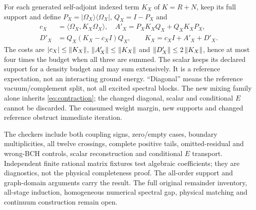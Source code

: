 For each generated self-adjoint indexed term $K_X$ of $K=R+N$, keep its full support and define $P_X=|\Omega_X\rangle\langle\Omega_X|$, $Q_X=I-P_X$ and
\begin{align}
c_X&=\langle\Omega_X,K_X\Omega_X\rangle,\quad
A'_X=P_XK_XQ_X+Q_XK_XP_X,\nonumber\\
D'_X&=Q_X(K_X-c_XI)Q_X,\qquad K_X=c_XI+A'_X+D'_X.
\label{eq:split}
\end{align}
The costs are $|c_X|\le\left\lVert K_X\right\rVert$, $\left\lVert A'_X\right\rVert\le\left\lVert K_X\right\rVert$ and
$\left\lVert D'_X\right\rVert\le2\left\lVert K_X\right\rVert$, hence at most four times the budget when all three are summed. The scalar keeps its declared support for a density budget and may sum extensively. It is a reference expectation, not an interacting ground energy. ``Diagonal'' means the reference vacuum/complement split, not all excited spectral blocks. The new mixing family alone inherits \eqref{eq:contraction}; the changed diagonal, scalar and conditional $E$ cannot be discarded. The consumed weight margin, new supports and changed reference obstruct immediate iteration.

The checkers include both coupling signs, zero/empty cases, boundary multiplicities, all twelve crossings, complete positive tails, omitted-residual and wrong-BCH controls, scalar reconstruction and conditional $E$ transport. Independent finite rational matrix fixtures test algebraic coefficients; they are diagnostics, not the physical completeness proof. The all-order support and graph-domain arguments carry the result. The full original remainder inventory, all-stage induction, homogeneous numerical spectral gap, physical matching and continuum construction remain open.
